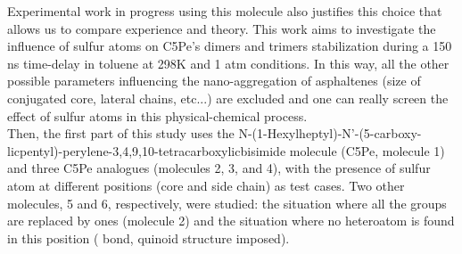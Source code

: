 Experimental work in progress using this molecule also justifies this choice that allows us to compare experience and theory. This work aims to investigate the influence of sulfur atoms on C5Pe's dimers and trimers stabilization during a 150 ns time-delay in toluene at 298K and 1 atm conditions. In this way, all the other possible parameters influencing the nano-aggregation of asphaltenes (size of conjugated core, lateral chains, etc...) are excluded and one can really screen the effect of sulfur atoms in this physical-chemical process.\\

Then, the first part of this study uses the N-(1-Hexylheptyl)-N'-(5-carboxy-licpentyl)-perylene-3,4,9,10-tetracarboxylicbisimide molecule (C5Pe, molecule 1) and three C5Pe analogues (molecules 2, 3, and 4), with the presence of sulfur atom at different positions (core and side chain) as test cases. Two other molecules, 5 and 6, respectively, were studied: the situation where all the  groups are replaced by  ones (molecule 2) and the situation where no heteroatom is found in this position ( bond, quinoid structure imposed). 

